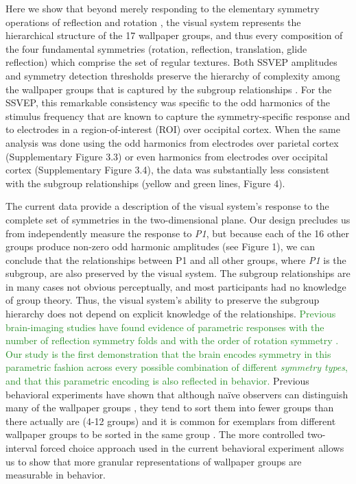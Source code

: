 \documentclass[11pt, twoside]{article}
\begin{document}
Here we show that beyond merely responding to the elementary symmetry operations of reflection \citep{Sasaki_2005, Tyler_2005} and rotation \citep{RN1725}, the visual system represents the hierarchical structure of the 17 wallpaper groups, and thus every composition of the four fundamental symmetries (rotation, reflection, translation, glide reflection) which comprise the set of regular textures. Both SSVEP amplitudes and symmetry detection thresholds preserve the hierarchy of complexity among the wallpaper groups that is captured by the subgroup relationships \citep{RN1711}. For the SSVEP, this remarkable consistency was specific to the odd harmonics of the stimulus frequency that are known to capture the symmetry-specific response \citep{RN1725} and to electrodes in a region-of-interest (ROI) over occipital cortex. When the same analysis was done using the odd harmonics from electrodes over parietal cortex (Supplementary Figure 3.3) or even harmonics from electrodes over occipital cortex (Supplementary Figure 3.4), the data was substantially less consistent with the subgroup relationships (yellow and green lines, Figure 4).

The current data provide a description of the visual system’s response to the complete set of symmetries in the two-dimensional plane. Our design precludes us from independently measure the response to \textit{P1}, but because each of the 16 other groups produce non-zero odd harmonic amplitudes (see Figure 1), we can conclude that the relationships between P1 and all other groups, where \textit{P1} is the subgroup, are also preserved by the visual system. The subgroup relationships are in many cases not obvious perceptually, and most participants had no knowledge of group theory. Thus, the visual system’s ability to preserve the subgroup hierarchy does not depend on explicit knowledge of the relationships. \textcolor{ForestGreen}{Previous brain-imaging studies have found evidence of parametric responses with the number of reflection symmetry folds \cite{keefe_2018, Sasaki_2005, makin_2016} and with the order of rotation symmetry \cite{RN1725}. Our study is the first demonstration that the brain encodes symmetry in this parametric fashion across every possible combination of different \textit{symmetry types}, and that this parametric encoding is also reflected in behavior.} Previous behavioral experiments have shown that although naïve observers can distinguish many of the wallpaper groups \citep{RN1253}, they tend to sort them into fewer groups than there actually are (4-12 groups) and it is common for exemplars from different wallpaper groups to be sorted in the same group \citep{RN172}. The more controlled two-interval forced choice approach used in the current behavioral experiment allows us to show that more granular representations of wallpaper groups are measurable in behavior.
\end{document}
